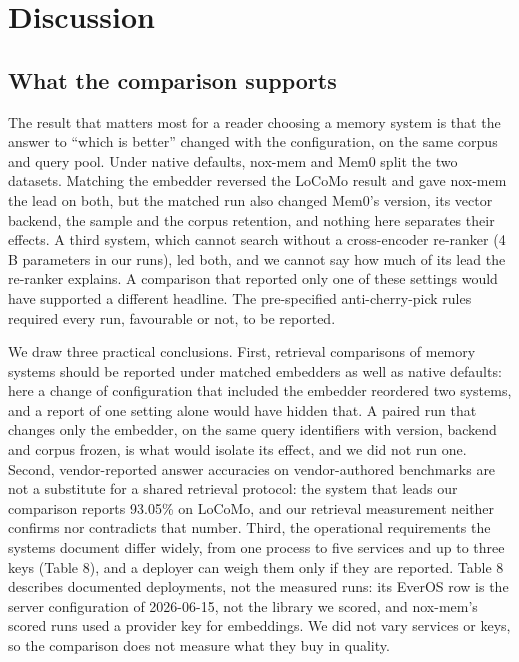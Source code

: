 \documentclass[a4paper,fleqn]{cas-sc}
\begin{document}
\section{Discussion}

\subsection{What the comparison supports}

The result that matters most for a reader choosing a memory system is that the answer to ``which is better'' changed with the configuration, on the same corpus and query pool. Under native defaults, nox-mem and Mem0 split the two datasets. Matching the embedder reversed the LoCoMo result and gave nox-mem the lead on both, but the matched run also changed Mem0's version, its vector backend, the sample and the corpus retention, and nothing here separates their effects. A third system, which cannot search without a cross-encoder re-ranker (4 B parameters in our runs), led both, and we cannot say how much of its lead the re-ranker explains. A comparison that reported only one of these settings would have supported a different headline. The pre-specified anti-cherry-pick rules required every run, favourable or not, to be reported.

We draw three practical conclusions. First, retrieval comparisons of memory systems should be reported under matched embedders as well as native defaults: here a change of configuration that included the embedder reordered two systems, and a report of one setting alone would have hidden that. A paired run that changes only the embedder, on the same query identifiers with version, backend and corpus frozen, is what would isolate its effect, and we did not run one. Second, vendor-reported answer accuracies on vendor-authored benchmarks are not a substitute for a shared retrieval protocol: the system that leads our comparison reports 93.05\% on LoCoMo, and our retrieval measurement neither confirms nor contradicts that number. Third, the operational requirements the systems document differ widely, from one process to five services and up to three keys (Table 8), and a deployer can weigh them only if they are reported. Table 8 describes documented deployments, not the measured runs: its EverOS row is the server configuration of 2026-06-15, not the library we scored, and nox-mem's scored runs used a provider key for embeddings. We did not vary services or keys, so the comparison does not measure what they buy in quality.
\end{document}
